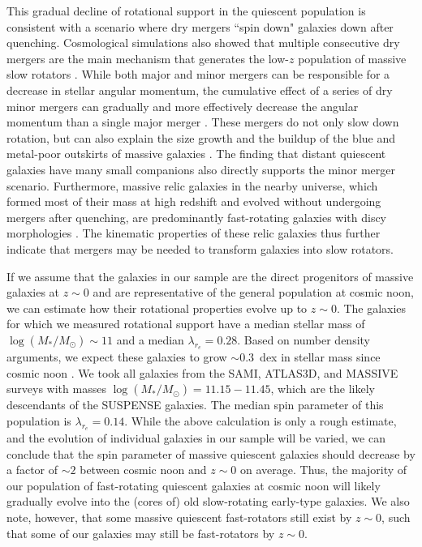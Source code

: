 \documentclass{aa}
\begin{document}
This gradual decline of rotational support in the quiescent population is consistent with a scenario where dry mergers ``spin down" galaxies down after quenching. Cosmological simulations also showed that multiple consecutive dry mergers are the main mechanism that generates the low-$z$ population of massive slow rotators \citep[e.g.][]{ZPenoyre2017, FSchulze2018, YDubois2016, VRodriguez2017, CLagos2018a, CLagos2018b, ARantala2024}. While both major and minor mergers can be responsible for a decrease in stellar angular momentum, the cumulative effect of a series of dry minor mergers can gradually and more effectively decrease the angular momentum than a single major merger \citep{TNaab2014,CLagos2018a,ARantala2024}. These mergers do not only slow down rotation, but can also explain the size growth \citep[e.g.][]{PvanDokkum2010, RBezanson2009, SPatel2013} and the buildup of the blue and metal-poor outskirts of massive galaxies \citep[e.g.][]{KSuess2020, IMartinNavarro2018, Cheng_2024}. The finding that distant quiescent galaxies have many small companions \citep{ANewman2012, KSuess2023} also directly supports the minor merger scenario. Furthermore, massive relic galaxies in the nearby universe, which formed most of their mass at high redshift and evolved without undergoing mergers after quenching, are predominantly fast-rotating galaxies with discy morphologies \citep[e.g.][]{AFerreMateu2012,AFerreMateu2017,AYilderim2015, CSpiniello2024, CTortora2025}. The kinematic properties of these relic galaxies thus further indicate that mergers may be needed to transform galaxies into slow rotators.

If we assume that the galaxies in our sample are the direct progenitors of massive galaxies at $z\sim0$ and are representative of the general population at cosmic noon, we can estimate how their rotational properties evolve up to $z\sim0$. The galaxies for which we measured rotational support have a median stellar mass of $\log(M_*/M_{\odot})\sim11$ and a median $\lambda_{r_e} = 0.28$. Based on number density arguments, we expect these galaxies to grow $\sim0.3$~dex in stellar mass since cosmic noon \citep[e.g.][]{PvanDokkum2010, AMuzzin2013, AHill2017}. We took all galaxies from the SAMI, ATLAS3D, and MASSIVE surveys with masses $\log(M_*/M_{\odot})= 11.15-11.45$, which are the likely descendants of the SUSPENSE galaxies. The median spin parameter of this population is $\lambda_{r_e} = 0.14$. While the above calculation is only a rough estimate, and the evolution of individual galaxies in our sample will be varied, we can conclude that the spin parameter of massive quiescent galaxies should decrease by a factor of $\sim2$ between cosmic noon and $z\sim0$ on average. Thus, the majority of our population of fast-rotating quiescent galaxies at cosmic noon will likely gradually evolve into the (cores of) old slow-rotating early-type galaxies. We also note, however, that some massive quiescent fast-rotators still exist by $z\sim0$, such that some of our galaxies may still be fast-rotators by $z\sim0$.\\
\end{document}
